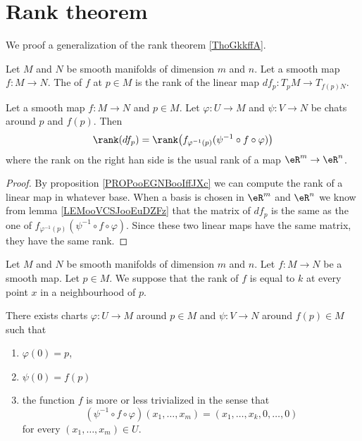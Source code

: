 \section{Rank theorem}

We proof a generalization of the rank theorem \ref{ThoGkkffA}.

\begin{definition}
	Let \( M\) and \( N\) be smooth manifolds of dimension \( m\) and \( n\). Let a smooth map \( f\colon M\to N\). The  of \( f\) at \( p\in M\) is the rank of the linear map \( df_p\colon T_pM\to T_{f(p)N}\).
\end{definition}

\begin{lemma}
	Let a smooth map \( f\colon M\to N\) and \( p\in M\). Let \( \varphi\colon U\to M\) and \( \psi\colon V\to N\) be chats around \( p\) and \( f(p)\). Then
	\begin{equation}
		\rank(df_p)=\rank\big( f_{\varphi^{-1}(p)}(\psi^{-1}\circ f\circ \varphi) \big)
	\end{equation}
	where the rank on the right han side is the usual rank of a map \( \eR^m\to \eR^n\).
\end{lemma}

\begin{proof}
	By proposition \ref{PROPooEGNBooIffJXc} we can compute the rank of a linear map in whatever base. When a basis is chosen in \( \eR^m\) and \( \eR^n\) we know from lemma \ref{LEMooVCSJooEuDZFz} that the matrix of \( df_p\) is the same as the one of \(  f_{\varphi^{-1}(p)}(\psi^{-1}\circ f\circ \varphi) \). Since these two linear maps have the same matrix, they have the same rank.
\end{proof}

\begin{theorem}       \label{THOooSWKVooTJQsXc}
	Let \( M\) and \( N\) be smooth manifolds of dimension \( m\) and \( n\). Let \( f\colon M\to N\) be a smooth map. Let \( p\in M\). We suppose that the rank of \( f\) is equal to \( k\) at every point \( x\) in a neighbourhood of \( p\).

	There exists charts \( \varphi\colon U\to M\) around \( p\in M\) and \( \psi\colon V\to N\) around \( f(p)\in M\) such that
	\begin{enumerate}
		\item
		      \( \varphi(0)=p\),
		\item
		      \( \psi(0)=f(p)\)
		\item
		      the function \( f\) is more or less trivialized in the sense that
		      \begin{equation}
			      (\psi^{-1}\circ f\circ\varphi)(x_1,\ldots, x_m)=(x_1,\ldots, x_k,0,\ldots, 0)
		      \end{equation}
		      for every \( (x_1,\ldots, x_m)\in U\).
	\end{enumerate}
\end{theorem}

